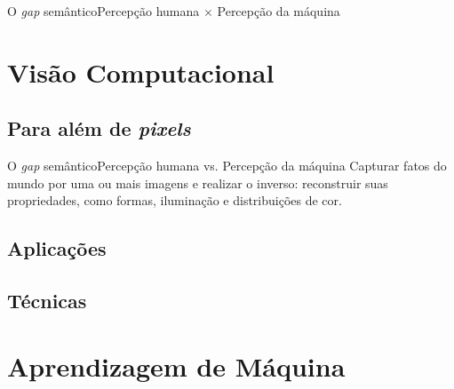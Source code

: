 \documentclass{beamer}
\begin{document}
    \begin{frame}{O \emph{gap} semântico}{Percepção humana $\times$ Percepção da máquina}

    
    \end{frame}

\section{Visão Computacional}

    \subsection{Para além de \emph{pixels}}

    \begin{frame}{O \emph{gap} semântico}{Percepção humana vs. Percepção da máquina}
        Capturar fatos do mundo por uma ou mais imagens e realizar o inverso: reconstruir suas propriedades, 
        como formas, iluminação e distribuições de cor.
    \end{frame}

    \subsection{Aplicações}
    

    \subsection{Técnicas}

\section{Aprendizagem de Máquina}
\end{document}
